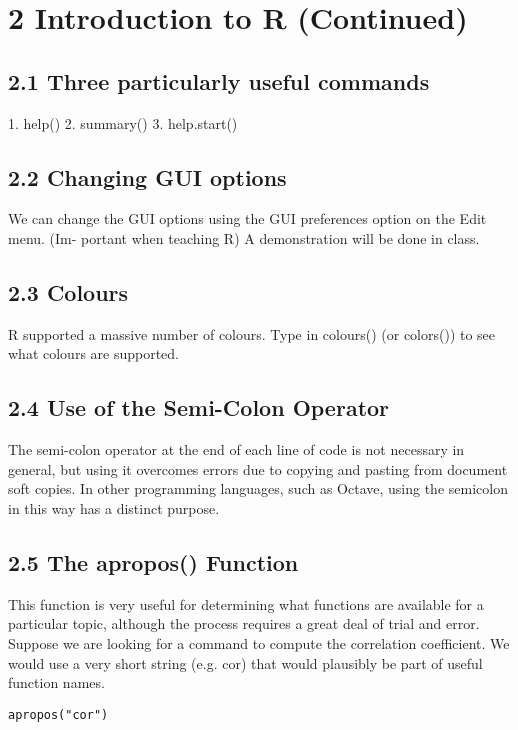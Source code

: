 \section*{2 Introduction to R (Continued)}
\subsection*{2.1 Three particularly useful commands}
1. help()
2. summary()
3. help.start()
\subsection*{2.2 Changing GUI options}
We can change the GUI options using the GUI preferences option on the Edit menu. (Im-
portant when teaching R) A demonstration will be done in class.
\subsection*{2.3 Colours}
R supported a massive number of colours. Type in colours() (or colors()) to see what colours
are supported.
\subsection*{2.4 Use of the Semi-Colon Operator}
The semi-colon operator at the end of each line of code is not necessary in general, but using it
overcomes errors due to copying and pasting from document soft copies. In other programming
languages, such as Octave, using the semicolon in this way has a distinct purpose.
\subsection*{2.5 The apropos() Function}
This function is very useful for determining what functions are available for a particular topic,
although the process requires a great deal of trial and error. Suppose we are looking for a
command to compute the correlation coefficient. We would use a very short string (e.g. cor)
that would plausibly be part of useful function names.
\begin{framed}
\begin{verbatim}
apropos("cor")
\end{verbatim}
\end{framed}

